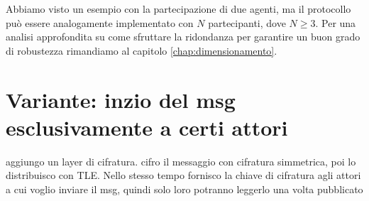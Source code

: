 Abbiamo visto un esempio con la partecipazione di due agenti,
ma il protocollo
può essere analogamente implementato con $ N $ partecipanti, dove $ N \geq 3 $.
Per una analisi approfondita su come sfruttare la ridondanza per
garantire un buon grado di robustezza rimandiamo al capitolo
\ref{chap:dimensionamento}.

\section{Variante: inzio del msg esclusivamente a certi attori}
aggiungo un layer di cifratura.
cifro il messaggio con cifratura simmetrica, poi lo distribuisco con TLE. Nello stesso tempo fornisco
la chiave di cifratura agli attori a cui voglio inviare il msg, 
quindi solo loro potranno leggerlo una volta pubblicato


